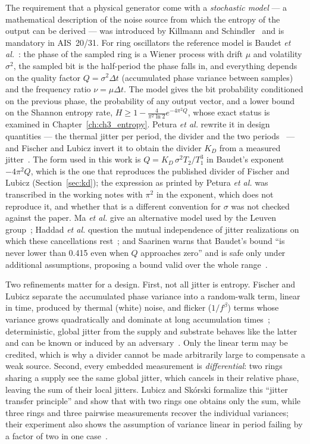 The requirement that a physical generator come with a \emph{stochastic
model} --- a mathematical description of the noise source from which the
entropy of the output can be derived --- was introduced by Killmann and
Schindler~\cite{killmann_2008_design, schindler_2002_evaluation} and is
mandatory in AIS~20/31. For ring oscillators the reference model is
Baudet \emph{et al.}~\cite{baudet_2011_security}: the phase of the sampled
ring is a Wiener process with drift $\mu$ and volatility $\sigma^2$, the
sampled bit is the half-period the phase falls in, and everything depends
on the quality factor $Q=\sigma^2\Delta t$ (accumulated phase variance
between samples) and the frequency ratio $\nu=\mu\Delta t$. The model
gives the bit probability conditioned on the previous phase, the
probability of any output vector, and a lower bound on the Shannon
entropy rate, $H \ge 1 - \frac{4}{\pi^2\ln 2}e^{-4\pi^2 Q}$, whose exact
status is examined in Chapter~\ref{ch:ch3_entropy}. Petura \emph{et al.}
rewrite it in design quantities --- the thermal jitter per period, the
divider and the two periods~\cite{petura_2016_survey} --- and Fischer and
Lubicz invert it to obtain
the divider $K_D$ from a measured jitter~\cite{fischer_2014_embedded}.
The form used in this work is $Q = K_D\,\sigma^2 T_2/T_1^3$ in Baudet's
exponent $-4\pi^2 Q$, which is the one that reproduces the published
divider of Fischer and Lubicz (Section~\ref{sec:kd}); the expression as
printed by Petura \emph{et al.} was transcribed in the working notes with
$\pi^2$ in the exponent, which does not reproduce it, and whether that is
a different convention for $\sigma$ was not checked against the paper. Ma
\emph{et al.} give an alternative model used by the Leuven
group~\cite{ma_2014_entropy}; Haddad \emph{et al.} question the mutual
independence of jitter realizations on which these cancellations
rest~\cite{haddad_2014_assumption}; and Saarinen warns that Baudet's bound
``is never lower than 0.415 even when $Q$ approaches zero'' and is safe
only under additional assumptions, proposing a bound valid over the whole
range~\cite{saarinen_2021_entropy}.

Two refinements matter for a design. First, not all jitter is entropy.
Fischer and Lubicz separate the accumulated phase variance into a
random-walk term, linear in time, produced by thermal (white) noise, and
flicker ($1/f^\beta$) terms whose variance grows quadratically and
dominate at long accumulation times~\cite{fischer_2014_embedded};
deterministic, global jitter from the supply and substrate behaves like
the latter and can be known or induced by an
adversary~\cite{fischer_2008_enhancing}. Only the linear term may be
credited, which is why a divider cannot be made arbitrarily large to
compensate a weak source. Second, every embedded measurement is
\emph{differential}: two rings sharing a supply see the same global
jitter, which cancels in their relative phase, leaving the sum of their
local jitters. Lubicz and Sk\'orski formalize this ``jitter transfer
principle'' and show that with two rings one obtains only the sum, while
three rings and three pairwise measurements recover the individual
variances; their experiment also shows the assumption of variance linear
in period failing by a factor of two in one case~\cite{lubicz_2024_jitter}.

